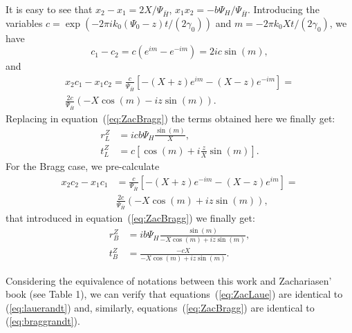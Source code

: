 \documentclass[preprint]{iucr}              %
\begin{document}
It is easy to see that $x_2-x_1=2 X / \Psi_{\bar{H}}$, $x_1 x_2 = -b \Psi_H/\Psi_{\bar{H}}$.
Introducing the variables $c=\exp(-2\pi i  k_0 (\Psi_0-z) t / (2 \gamma_0))$ and $m=-2\pi k_0 X t / (2 \gamma_0)$, we have
\begin{equation}
    c_1-c_2=c(e^{im}-e^{-im})=2ic \sin(m),  \nonumber
\end{equation}
and
\begin{subequations}
\begin{align}
    x_2 c_1 - x_1 c_2 = \frac{c}{ \Psi_{\bar{H}}} \left[ 
 -(X+z)e^{im}-(X-z)e^{-im}\right] = \nonumber \\
 \frac{2 c}{\Psi_{\bar{H}}}(-X \cos(m) - i z \sin(m)). \nonumber
\end{align}
\end{subequations}
Replacing in equation~(\ref{eq:ZacBragg}) the terms obtained here  we finally get:
	\begin{subequations}
	\label{eq:ZacBragg2}
    \begin{align}
	r^Z_{L} &=  i c b \Psi_H \frac{\sin(m)}{X}, \nonumber \\
 	t^Z_{L} &= c [\cos(m) + i\frac{z}{X} \sin(m)].  \nonumber  
    \end{align}
    \end{subequations}
For the Bragg case, we pre-calculate
\begin{subequations}
\begin{align}
    x_2 c_2 - x_1 c_1 &=  
    \frac{c}{ \Psi_{\bar{H}}} \left[ 
 -(X+z)e^{-im}-(X-z)e^{im}\right] = \nonumber \\
 &\frac{2c}{ \Psi_{\bar{H}}}(-X \cos(m) + i z \sin(m)), \nonumber
\end{align}
\end{subequations}
that introduced in equation~(\ref{eq:ZacBragg}) we finally get:
\label{eq:ZacLaue2}
\begin{subequations}
\begin{align}
	r^Z_{B} &=  i b \Psi_H \frac{\sin(m)}{ - X \cos(m) + i z \sin(m)}, \\
 	t^Z_{B} &= \frac{ -c X}{-X \cos(m) + i z \sin(m)}. 
\end{align}
\end{subequations}

Considering the equivalence of notations between this work and Zachariasen' book (see Table 1), we can verify that equations~(\ref{eq:ZacLaue}) are identical to (\ref{eq:lauerandt}) and, similarly,  equations~(\ref{eq:ZacBragg}) are identical to (\ref{eq:braggrandt}).
\end{document}
